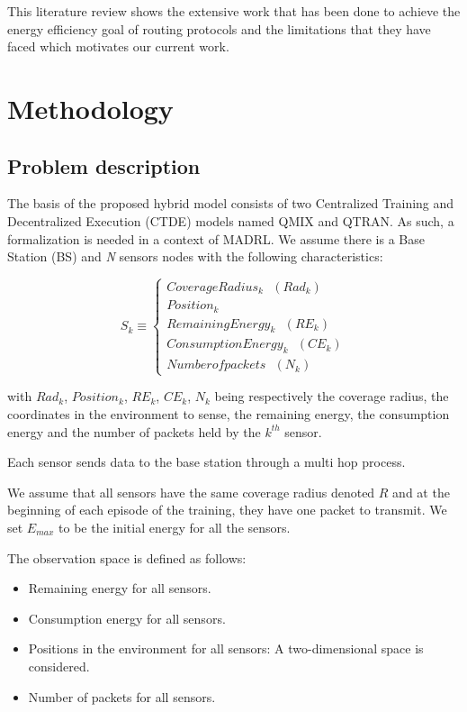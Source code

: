 This literature review shows the extensive work that has been done to achieve the energy efficiency goal of routing protocols and the limitations that they have faced which motivates our current work.


\section{Methodology}
\subsection{Problem description}
The basis of the proposed hybrid model consists of two Centralized Training and Decentralized Execution (CTDE) models named QMIX and QTRAN. As such, a formalization is needed in a context of MADRL. We assume there is a Base Station (BS) and \textit{N} sensors nodes with the following characteristics:

\begin{equation} 
S_k \equiv 
\begin{cases}
CoverageRadius_k \text{ } \left(Rad_k\right)  \\
Position_k \\
RemainingEnergy_k \text{ } \left(RE_k\right) \\
ConsumptionEnergy_k \text{ } \left(CE_k\right) \\
Number of packets \text{ } \left(N_k\right) 
\end{cases}
\end{equation}

with $Rad_k$, $Position_k$, $RE_k$, $CE_k$, $N_k$ being respectively the coverage radius, the coordinates in the environment to sense, the remaining energy, the consumption energy and the number of packets held by the $k^{th}$ sensor.  

Each sensor sends data to the base station through a multi hop process.

We assume that all sensors have the same coverage radius denoted $R$ and at the beginning of each episode of the training, they have one packet to transmit. We set $E_{max}$ to be the initial energy for all the sensors. 

The observation space is defined as follows:
\begin{itemize}
    \item Remaining energy for all sensors.
    \item Consumption energy for all sensors.
    \item Positions in the environment for all sensors: A two-dimensional space is considered.
    \item Number of packets for all sensors.
\end{itemize}	
    

